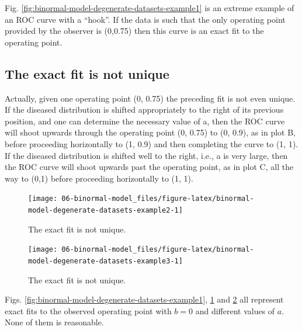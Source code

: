 \documentclass[
]{book}
\begin{document}
Fig. \ref{fig:binormal-model-degenerate-datasets-example1} is an extreme example of an ROC curve with a ``hook''. If the data is such that the only operating point provided by the observer is (0,0.75) then this curve is an exact fit to the operating point.

\hypertarget{binormal-model-exact-fit-not-unique}{%
\subsection{The exact fit is not unique}\label{binormal-model-exact-fit-not-unique}}

Actually, given one operating point (0, 0.75) the preceding fit is not even unique. If the diseased distribution is shifted appropriately to the right of its previous position, and one can determine the necessary value of a, then the ROC curve will shoot upwards through the operating point (0, 0.75) to (0, 0.9), as in plot B, before proceeding horizontally to (1, 0.9) and then completing the curve to (1, 1). If the diseased distribution is shifted well to the right, i.e., a is very large, then the ROC curve will shoot upwards past the operating point, as in plot C, all the way to (0,1) before proceeding horizontally to (1, 1).

\begin{figure}

{\centering \texttt{[image: 06-binormal-model\_files/figure-latex/binormal-model-degenerate-datasets-example2-1]} 

}

\caption{The exact fit is not unique.}\label{fig:binormal-model-degenerate-datasets-example2}
\end{figure}

\begin{figure}

{\centering \texttt{[image: 06-binormal-model\_files/figure-latex/binormal-model-degenerate-datasets-example3-1]} 

}

\caption{The exact fit is not unique.}\label{fig:binormal-model-degenerate-datasets-example3}
\end{figure}

Figs. \ref{fig:binormal-model-degenerate-datasets-example1}, \ref{fig:binormal-model-degenerate-datasets-example2} and \ref{fig:binormal-model-degenerate-datasets-example3} all represent exact fits to the observed operating point with \(b = 0\) and different values of \(a\). None of them is reasonable.
\end{document}
